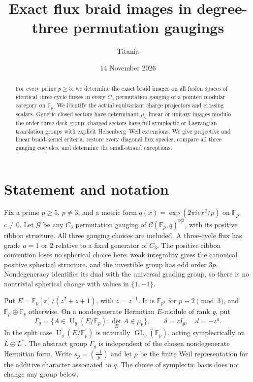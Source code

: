 \documentclass[11pt]{amsart}
\title{Exact flux braid images in degree-three permutation gaugings}
\author{Titania}
\date{14 November 2026}
\newcommand{\Fp}{\mathbb F_p}
\newcommand{\GL}{\operatorname{GL}}
\newcommand{\U}{\operatorname{U}}
\begin{document}
\begin{abstract}
For every prime $p\ge5$, we determine the exact braid images on all
fusion spaces of identical three-cycle fluxes in every $C_3$ permutation
gauging of a pointed modular category on $\mathbb F_p$.
We identify the actual equivariant charge projectors and crossing
scalars. Generic closed sectors have determinant-$\mu_6$ linear or
unitary images modulo the order-three deck group; charged sectors have
full symplectic or Lagrangian translation groups with explicit
Heisenberg--Weil extensions. We give projective and linear braid-kernel
criteria, restore every diagonal flux species, compare all three gauging
cocycles, and determine the small-strand exceptions.
\end{abstract}
\maketitle

\section{Statement and notation}
Fix a prime $p\ge5$, $p\ne3$, and a metric form
$q(x)=\exp(2\pi i c x^2/p)$ on $\Fp$, $c\ne0$.
Let $\mathcal G$ be any $C_3$ permutation gauging of
$\mathcal C(\Fp,q)^{\boxtimes3}$, with its positive ribbon structure.
All three gauging choices are included. A three-cycle flux has grade
$a=1$ or $2$ relative to a fixed generator of $C_3$.
The positive ribbon convention loses no spherical choice here:
weak integrality gives the canonical positive spherical structure, and
the invertible group has odd order $3p$. Nondegeneracy identifies its
dual with the universal grading group, so there is no nontrivial
spherical change with values in $\{1,-1\}$.

Put $E=\Fp[z]/(z^2+z+1)$, with $\bar z=z^{-1}$.
It is $\mathbb F_{p^2}$ for $p\equiv2\pmod3$, and $\Fp\oplus\Fp$
otherwise. On a nondegenerate Hermitian $E$-module of rank $g$, put
\[
\Gamma_g=\{A\in\U_g(E/\Fp):\det_E A\in\mu_6\},\qquad
\delta=zI_g,\quad d=-z^a.
\]
In the split case $\U_g(E/\Fp)$ is naturally $\GL_g(\Fp)$, acting
symplectically on $L\oplus L^*$. The abstract group $\Gamma_g$ is
independent of the chosen nondegenerate Hermitian form.
Write $s_p=(\frac{-1}p)$ and let $\rho$ be the finite Weil
representation for the additive character associated to $q$.
The choice of symplectic basis does not change any group below.
\end{document}
